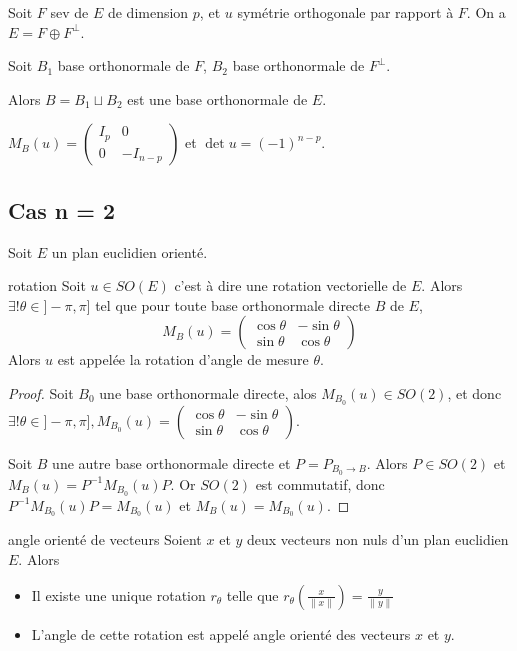 Soit $F$ sev de $E$ de dimension $p$, et $u$ symétrie orthogonale par rapport à $F$. 
On a $E = F \oplus F^\perp$. 

Soit $B_1$ base orthonormale de $F$, $B_2$ base orthonormale de $F^\perp$. 

Alors $B = B_1 \sqcup B_2$ est une base orthonormale de $E$. 

$M_B(u) = \begin{pmatrix}
    I_p & 0 \\
    0 & - I_{n - p}
\end{pmatrix}$ et $\det u = (-1)^{n - p}$.

\subsection{Cas n = 2}

Soit $E$ un plan euclidien orienté. 

\begin{theoreme}{rotation}{}
    Soit $u \in SO(E)$ c'est à dire une rotation vectorielle de $E$. 
    Alors $\exists ! \theta \in ]- \pi, \pi]$ tel que pour toute base orthonormale directe
    $B$ de $E$, 
$$M_B(u) = \begin{pmatrix}
    \cos \theta & -\sin \theta \\
    \sin \theta & \cos \theta
\end{pmatrix}$$
    Alors $u$ est appelée la rotation d'angle de mesure $\theta$. 
\end{theoreme}


\begin{proof}
    Soit $B_0$ une base orthonormale directe, alos 
    $M_{B_0}(u) \in SO(2)$, et donc 
    $\exists ! \theta \in ]- \pi, \pi], M_{B_0}(u) = \begin{pmatrix}
    \cos \theta & -\sin \theta \\
    \sin \theta & \cos \theta
\end{pmatrix}$.

    Soit $B$ une autre base orthonormale directe et $P = P_{B_0 \to B}$. Alors
    $P \in SO(2)$ et $M_B(u) = P^{-1} M_{B_0}(u) P$. 
    Or $SO(2)$ est commutatif, donc $P^{-1} M_{B_0}(u) P = M_{B_0}(u)$ et $M_B(u) = M_{B_0}(u)$.
\end{proof}

\begin{theoreme}{angle orienté de vecteurs}{}
    Soient $x$ et $y$ deux vecteurs non nuls d'un plan euclidien $E$. Alors 
    \begin{itemize}
        \item Il existe une unique rotation $r_\theta$ telle que $r_\theta\left( \frac x {\| x \|} \right) = \frac y {\| y \|}$
        \item L'angle de cette rotation est appelé angle orienté des vecteurs $x$ et $y$.
    \end{itemize}
\end{theoreme}

